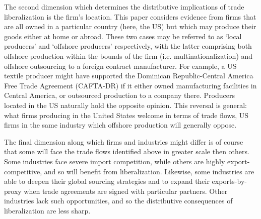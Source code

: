 \documentclass[hidelinks,12pt,letter]{article}
\begin{document}
The second dimension which determines the distributive implications of trade liberalization is the firm's location. This paper considers evidence from firms that are all owned in a particular country (here, the US) but which may produce their goods either at home or abroad. These two cases may be referred to as `local producers' and `offshore producers' respectively, with the latter comprising both offshore production within the bounds of the firm (i.e. multinationalization) and offshore outsourcing to a foreign contract manufacturer. For example, a US textile producer might have supported the Dominican Republic-Central America Free Trade Agreement (CAFTA-DR) if it either owned manufacturing facilities in Central America, or outsourced production to a company there. Producers located in the US naturally hold the opposite opinion. %
This reversal is general: what firms producing in the United States welcome in terms of trade flows, US firms in the same industry which offshore production will generally oppose. %

The final dimension along which firms and industries might differ is of course that some will face the trade flows identified above in greater scale then others. Some industries face severe import competition, while others are highly export-competitive, and so will benefit from liberalization. Likewise, some industries are able to deepen their global sourcing strategies and to expand their exports-by-proxy when trade agreements are signed with particular partners. Other industries lack such opportunities, and so the distributive consequences of liberalization are less sharp. 

\end{document}
